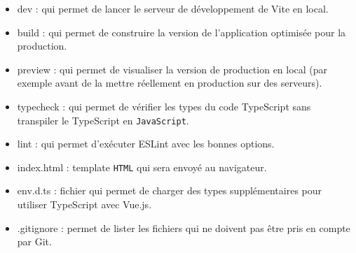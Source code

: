 \documentclass{article}
\begin{document}
\begin{itemize}
\item {\color{blue} dev} : qui permet de lancer le serveur de développement de {\color{monOrange} Vite} en local.
\item  {\color{blue} build} : qui permet de construire la version de l'application optimisée pour la production.
\item  {\color{blue} preview}  : qui permet de visualiser la version de production en local (par exemple avant de la mettre réellement en production sur des serveurs).
\item  {\color{blue} typecheck}  : qui permet de vérifier les types du code {\color{monOrange} TypeScript} sans transpiler le {\color{monOrange} TypeScript} en {\tt JavaScript}.
\item  {\color{blue} lint}  : qui permet d'exécuter {\color{monOrange} ESLint} avec les bonnes options.
\item  {\color{blue} index.html } : template {\tt HTML} qui sera envoyé au navigateur.
\item  {\color{blue} env.d.ts}  : fichier qui permet de charger des types supplémentaires pour utiliser {\color{monOrange} TypeScript} avec {\color{monOrange} Vue.js}.
\item  {\color{blue} .gitignore}  : permet de lister les fichiers qui ne doivent pas être pris en compte par {\color{monOrange} Git}.


\end{itemize}
\end{document}
